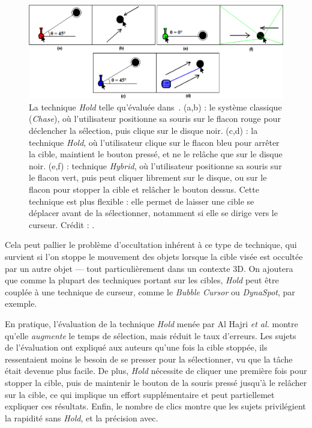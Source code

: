 	\begin{figure}[!htb]
		\centering
		\includegraphics[width=\textwidth]{figures/ch2/hold}
		\caption[La technique \emph{Hold}]{La technique \emph{Hold} telle qu'évaluée dans~\cite{hajri2011moving}. (a,b) : le système classique (\emph{Chase}), où l'utilisateur positionne sa souris sur le flacon rouge pour déclencher la sélection, puis clique sur le disque noir. (c,d) : la technique \emph{Hold}, où l'utilisateur clique sur le flacon bleu pour arrêter la cible, maintient le bouton pressé, et ne le relâche que sur le disque noir. (e,f) : technique \emph{Hybrid}, où l'utilisateur positionne sa souris sur le flacon vert, puis peut cliquer librement sur le disque, ou sur le flacon pour stopper la cible et relâcher le bouton dessus. Cette technique est plus flexible : elle permet de laisser une cible se déplacer avant de la sélectionner, notamment si elle se dirige vers le curseur. Crédit : \cite{hajri2011moving}.}
		\label{fig:hold}
	\end{figure}
	
	Cela peut pallier le problème d'occultation inhérent à ce type de technique, qui survient si l'on stoppe le mouvement des objets lorsque la cible visée est occultée par un autre objet --- tout particulièrement dans un contexte 3D. On ajoutera que comme la plupart des techniques portant sur les cibles, \emph{Hold} peut être couplée à une technique de curseur, comme le \emph{Bubble Cursor} ou \emph{DynaSpot}, par exemple.
	
	En pratique, l'évaluation de la technique \emph{Hold} menée par Al Hajri \emph{et al.} montre qu'elle \emph{augmente} le temps de sélection, mais réduit le taux d'erreurs. Les sujets de l'évaluation ont expliqué aux auteurs qu'une fois la cible stoppée, ils ressentaient moins le besoin de se presser pour la sélectionner, vu que la tâche était devenue plus facile. De plus, \emph{Hold} nécessite de cliquer une première fois pour stopper la cible, puis de maintenir le bouton de la souris pressé jusqu'à le relâcher sur la cible, ce qui implique un effort supplémentaire et peut partiellemet expliquer ces résultats. Enfin, le nombre de clics montre que les sujets privilégient la rapidité sans \emph{Hold}, et la précision avec.
	

